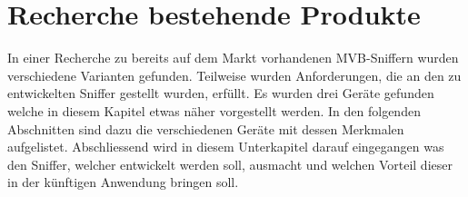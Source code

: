 \section{Recherche bestehende Produkte}
\label{sec:recherche}

In einer Recherche zu bereits auf dem Markt vorhandenen MVB-Sniffern wurden verschiedene Varianten
gefunden. Teilweise wurden Anforderungen, die an den zu entwickelten Sniffer gestellt wurden, erfüllt.
Es wurden drei Geräte gefunden welche in diesem Kapitel etwas näher vorgestellt werden. In den folgenden Abschnitten sind dazu die verschiedenen Geräte mit dessen Merkmalen aufgelistet. Abschliessend wird in diesem Unterkapitel darauf eingegangen was den Sniffer, welcher entwickelt werden soll, ausmacht und welchen Vorteil dieser in der künftigen Anwendung bringen soll.

